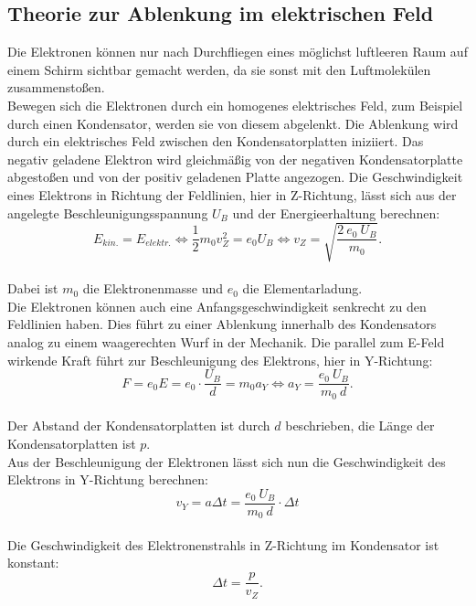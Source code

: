\subsection{Theorie zur Ablenkung im elektrischen Feld}
Die Elektronen können nur nach Durchfliegen eines möglichst luftleeren Raum auf einem Schirm sichtbar gemacht werden, da sie sonst mit den Luftmolekülen zusammenstoßen.
\\Bewegen sich die Elektronen durch ein homogenes elektrisches Feld, zum Beispiel durch einen Kondensator, werden sie von diesem abgelenkt.
Die Ablenkung wird durch ein elektrisches Feld zwischen den Kondensatorplatten iniziiert.
Das negativ geladene Elektron wird gleichmäßig von der negativen Kondensatorplatte abgestoßen und von der positiv geladenen Platte angezogen.
Die Geschwindigkeit eines Elektrons in Richtung der Feldlinien, hier in Z-Richtung, lässt sich aus der angelegte Beschleunigungsspannung $U_{B}$ und der Energieerhaltung berechnen:
\begin{equation}
  E_{kin.}=E_{elektr.} \Leftrightarrow \frac{1}{2}m_{0}v_{Z}^{2}=e_{0}U_{B} \Leftrightarrow v_{Z}= \sqrt{ \frac{2 \: e_{0} \: U_{B}} {m_{0}} }.
\label{eqn:eerh}
\end{equation}
\\Dabei ist $m_{0}$ die Elektronenmasse und $e_{0}$ die Elementarladung.
\\Die Elektronen können auch eine Anfangsgeschwindigkeit senkrecht zu den Feldlinien haben.
Dies führt zu einer Ablenkung innerhalb des Kondensators analog zu einem waagerechten Wurf in der Mechanik.
Die parallel zum E-Feld wirkende Kraft führt zur Beschleunigung des Elektrons, hier in Y-Richtung:
\begin{equation*}
  F=e_{0}E=e_{0}\cdot \frac{U_{B}}{d}=m_{0}a_{Y} \Leftrightarrow a_{Y}= \frac{e_{0}\: U_{B}}{m_{0} \: d}.
\end{equation*}
\\Der Abstand der Kondensatorplatten ist durch $d$ beschrieben, die Länge der Kondensatorplatten ist $p$.
\\Aus der Beschleunigung der Elektronen lässt sich nun die Geschwindigkeit des Elektrons in Y-Richtung berechnen:
\begin{equation}
  v_{Y}=a \Delta t=\frac{e_{0}\:U_{B}}{m_{0}\:d}\cdot \Delta t
\label{eqn:vy}
\end{equation}
\\Die Geschwindigkeit des Elektronenstrahls in Z-Richtung im Kondensator ist konstant:
\begin{equation}
  \Delta t = \frac{p}{v_{Z}}.
\label{eqn:vz}
\end{equation}
